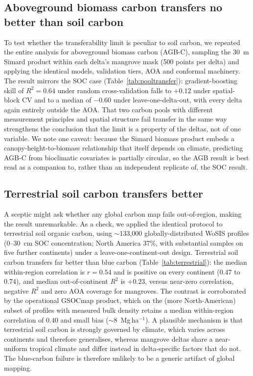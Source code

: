\documentclass[twocolumn,9pt]{extarticle}
\begin{document}
\subsection*{Aboveground biomass carbon transfers no better than soil carbon}
To test whether the transferability limit is peculiar to soil carbon, we repeated the
entire analysis for aboveground biomass carbon (AGB-C), sampling the 30~m Simard
product within each delta's mangrove mask (500 points per delta) and applying the
identical models, validation tiers, AOA and conformal machinery. The result mirrors the
SOC case (Table~\ref{tab:pooltransfer}): gradient-boosting skill of $R^2=0.64$ under
random cross-validation falls to $+0.12$ under spatial-block CV and to a median of
$-0.60$ under leave-one-delta-out, with every delta again entirely outside the AOA.
That two carbon pools with different measurement principles and spatial structure
fail transfer in the same way strengthens the conclusion that the limit is a property
of the deltas, not of one variable. We note one caveat: because the Simard biomass
product embeds a canopy-height-to-biomass relationship that itself depends on climate,
predicting AGB-C from bioclimatic covariates is partially circular, so the AGB result
is best read as a companion to, rather than an independent replicate of, the SOC
result.

\begin{table}[t]
\centering
\caption{Transferability of the two carbon pools under the same gradient-boosting
model and validation tiers. Both collapse from strong random-CV skill to negative
leave-one-delta-out skill, with zero area-of-applicability coverage.}
\label{tab:pooltransfer}

\end{table}

\subsection*{Terrestrial soil carbon transfers better}
A sceptic might ask whether any global carbon map fails out-of-region, making the result
unremarkable. As a check, we applied the identical protocol to terrestrial soil organic
carbon, using $\sim$133{,}000 globally-distributed WoSIS profiles (0--30~cm SOC
concentration; North America 37\%, with substantial samples on five further continents)
under a leave-one-continent-out design. Terrestrial soil carbon transfers far better than
blue carbon (Table~\ref{tab:terrestrial}): the median within-region correlation is
$r=0.54$ and is positive on every continent (0.47 to 0.74), and median out-of-continent
$R^2$ is $+0.23$, versus near-zero correlation, negative $R^2$ and zero AOA coverage for
mangroves. The contrast is corroborated by the operational GSOCmap product, which on the
(more North-American) subset of profiles with measured bulk density retains a median
within-region correlation of $0.40$ and small bias ($\sim$8~Mg\,ha$^{-1}$). A plausible
mechanism is that terrestrial soil carbon is strongly governed by climate, which varies
across continents and therefore generalises, whereas mangrove deltas share a near-uniform
tropical climate and differ instead in delta-specific factors that do not. The blue-carbon
failure is therefore unlikely to be a generic artifact of global mapping.
\end{document}
